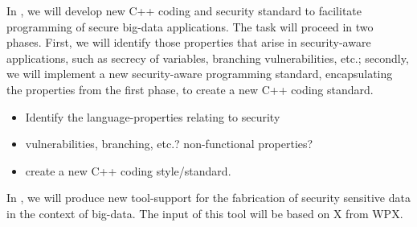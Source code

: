 \begin{Workpackage}{\thewpno}
\begin{Task}
	In \theTask, we will develop new C++ coding and security standard to facilitate programming of secure big-data applications. The task will proceed in two phases. First, we will identify those properties that arise in security-aware applications, such as secrecy of variables, branching vulnerabilities, etc.; secondly, we will implement a new security-aware programming standard, encapsulating the properties from the first phase, to create a new C++ coding standard. 
	\begin{itemize}
		\item Identify the language-properties relating to security 
		\item vulnerabilities, branching, etc.? non-functional properties?
		\item create a new C++ coding style/standard.
	\end{itemize}
\end{Task}

\begin{Task}
	
	\TaskResults{%
	}
	\TaskHeader{}
	
	In \theTask, we will produce new tool-support for the fabrication of security sensitive data in the context of big-data. The input of this tool will be based on X from WPX. 
\end{Task}

\begin{Task}
	
	\TaskResults{%
	}
	\TaskHeader{}
	

\end{Task}
\end{Workpackage}
